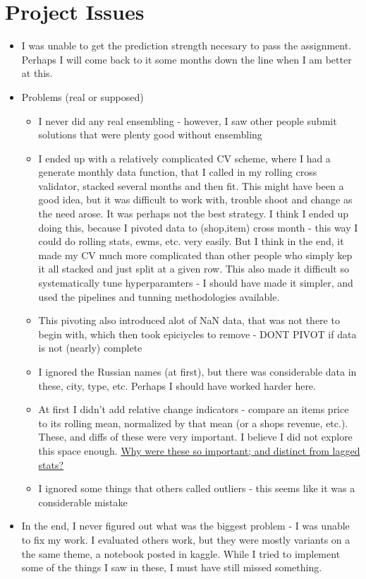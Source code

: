 \documentclass[a4paper]{report}
\begin{document}
\chapter{Project Issues}
\begin{itemize}
  \item I was unable to get the prediction strength necesary to pass the assignment. Perhaps I will come back to it some months down the line when I am better at this.
  \item Problems (real or supposed)
    \begin{itemize}
      \item I never did any real ensembling - however, I saw other people submit solutions that were plenty good without ensembling
      \item I ended up with a relatively complicated CV scheme, where I had a generate monthly data function, that I called in my rolling cross validator, stacked several months and then fit. This might have been a good idea, but it was difficult to work with, trouble shoot and change as the need arose. It was perhaps not the best strategy.
	\subitem I think I ended up doing this, because I pivoted data to (shop,item) cross month - this way I could do rolling stats, ewms, etc. very easily. But I think in the end, it made my CV much more complicated than other people who simply kep it all stacked and just split at a given row.
	\subitem This also made it difficult so systematically tune hyperparamters -  I should have made it simpler, and used the pipelines and tunning methodologies available.
      \item This pivoting also introduced alot of NaN data, that was not there to begin with, which then took epiciycles to remove - DONT PIVOT if data is not (nearly) complete
      \item I ignored the Russian names (at first), but there was considerable data in these, city, type, etc. Perhaps I should have worked harder here.
      \item At first I didn't add relative change indicators - compare an items price to its rolling mean, normalized by that mean (or a shops revenue, etc.). These, and diffs of these were very important. I believe I did not explore this space enough. \underline{Why were these so important; and distinct from lagged stats?}
      \item I ignored some things that others called outliers - this seems like it was a considerable mistake
    \end{itemize}
  \item In the end, I never figured out what was the biggest problem - I was unable to fix my work. I evaluated others work, but they were mostly variants on a the same theme, a notebook posted in kaggle. While I tried to implement some of the things I saw in these, I must have still missed something.
\end{itemize}	
\end{document}
